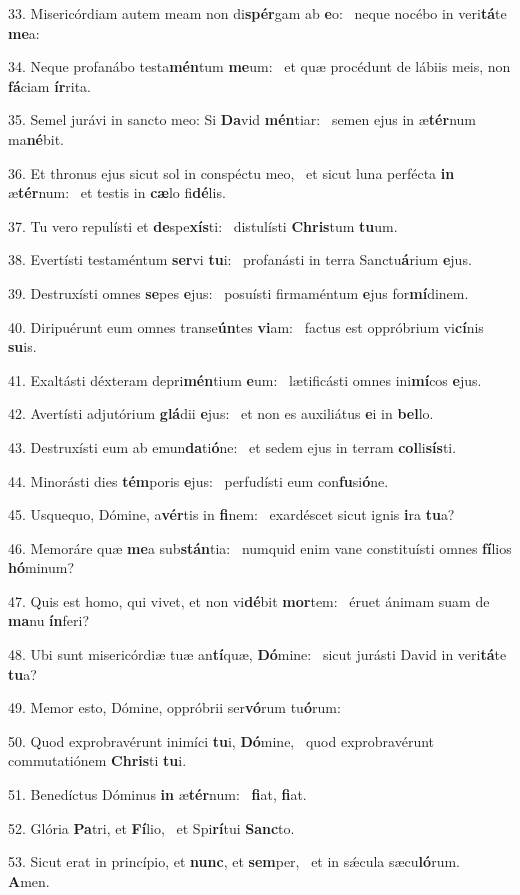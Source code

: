 33. Misericórdiam autem meam non di\textbf{spér}gam ab \textbf{e}o: \ast\  neque nocébo in veri\textbf{tá}te \textbf{me}a:\

34. Neque profanábo testa\textbf{mén}tum \textbf{me}um: \ast\  et quæ procédunt de lábiis meis, non \textbf{fá}ciam \textbf{ír}rita.\

35. Semel jurávi in sancto meo: Si \textbf{Da}vid \textbf{mén}tiar: \ast\  semen ejus in æ\textbf{tér}num ma\textbf{né}bit.\

36. Et thronus ejus sicut sol in conspéctu meo, \dag\  et sicut luna perfécta \textbf{in} æ\textbf{tér}num: \ast\  et testis in \textbf{cæ}lo fi\textbf{dé}lis.\

37. Tu vero repulísti et \textbf{de}spe\textbf{xís}ti: \ast\  distulísti \textbf{Chris}tum \textbf{tu}um.\

38. Evertísti testaméntum \textbf{ser}vi \textbf{tu}i: \ast\  profanásti in terra Sanctu\textbf{á}rium \textbf{e}jus.\

39. Destruxísti omnes \textbf{se}pes \textbf{e}jus: \ast\  posuísti firmaméntum \textbf{e}jus for\textbf{mí}dinem.\

40. Diripuérunt eum omnes transe\textbf{ún}tes \textbf{vi}am: \ast\  factus est oppróbrium vi\textbf{cí}nis \textbf{su}is.\

41. Exaltásti déxteram depri\textbf{mén}tium \textbf{e}um: \ast\  lætificásti omnes ini\textbf{mí}cos \textbf{e}jus.\

42. Avertísti adjutórium \textbf{glá}dii \textbf{e}jus: \ast\  et non es auxiliátus \textbf{e}i in \textbf{bel}lo.\

43. Destruxísti eum ab emun\textbf{da}ti\textbf{ó}ne: \ast\  et sedem ejus in terram \textbf{col}li\textbf{sís}ti.\

44. Minorásti dies \textbf{tém}poris \textbf{e}jus: \ast\  perfudísti eum con\textbf{fu}si\textbf{ó}ne.\

45. Usquequo, Dómine, a\textbf{vér}tis in \textbf{fi}nem: \ast\  exardéscet sicut ignis \textbf{i}ra \textbf{tu}a?\

46. Memoráre quæ \textbf{me}a sub\textbf{stán}tia: \ast\  numquid enim vane constituísti omnes \textbf{fí}lios \textbf{hó}minum?\

47. Quis est homo, qui vivet, et non vi\textbf{dé}bit \textbf{mor}tem: \ast\  éruet ánimam suam de \textbf{ma}nu \textbf{ín}feri?\

48. Ubi sunt misericórdiæ tuæ an\textbf{tí}quæ, \textbf{Dó}mine: \ast\  sicut jurásti David in veri\textbf{tá}te \textbf{tu}a?\

49. Memor esto, Dómine, oppróbrii ser\textbf{vó}rum tu\textbf{ó}rum: \ast\  \

50. Quod exprobravérunt inimíci \textbf{tu}i, \textbf{Dó}mine, \ast\  quod exprobravérunt commutatiónem \textbf{Chris}ti \textbf{tu}i.\

51. Benedíctus Dóminus \textbf{in} æ\textbf{tér}num: \ast\  \textbf{fi}at, \textbf{fi}at.\

52. Glória \textbf{Pa}tri, et \textbf{Fí}lio, \ast\  et Spi\textbf{rí}tui \textbf{Sanc}to.\

53. Sicut erat in princípio, et \textbf{nunc}, et \textbf{sem}per, \ast\  et in sǽcula sæcu\textbf{ló}rum. \textbf{A}men.\

